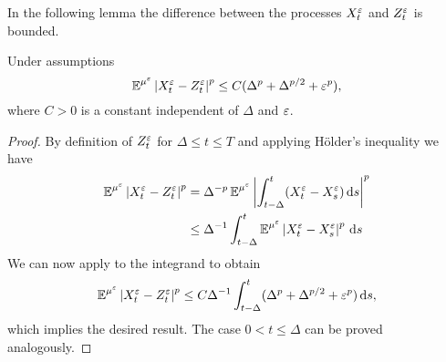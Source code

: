 \documentclass[10pt]{article}
\begin{document}
In the following lemma the difference between the processes $X_t^\varepsilon$ and $Z_t^\varepsilon$ is bounded. 
\begin{lemma}\label{lem:BoundDiffCont} Under assumptions 
	\begin{equation}
		\operatorname{\mathbb{E}}^{\mu^\varepsilon} \left\lvert X_t^\varepsilon - Z_t^\varepsilon\right\rvert^p \leq C (\Delta^p + \Delta^{p/2} + \varepsilon^p),
	\end{equation}
	where $C > 0$ is a constant independent of $\Delta$ and $\varepsilon$.
\end{lemma}
\begin{proof} By definition of $Z_t^\varepsilon$ for $\Delta \leq t \leq T$ and applying Hölder's inequality we have
	\begin{equation}
	\begin{aligned}
		\operatorname{\mathbb{E}}^{\mu^\varepsilon} \left\lvert X_t^\varepsilon - Z_t^\varepsilon\right\rvert^p &= \Delta^{-p} \operatorname{\mathbb{E}}^{\mu^\varepsilon} \left\lvert\int_{t-\Delta}^t (X_t^\varepsilon - X_s^\varepsilon) \,\mathrm{d} s\right\rvert^p \\
		&\leq \Delta^{-1} \int_{t-\Delta}^t  \operatorname{\mathbb{E}}^{\mu^\varepsilon} \left\lvert X_t^\varepsilon - X_s^\varepsilon\right\rvert^p \,\mathrm{d} s
	\end{aligned}
	\end{equation}
	We can now apply \cite[Lemma 6.1]{PaS07} to the integrand to obtain
	\begin{equation}
		\operatorname{\mathbb{E}}^{\mu^\varepsilon} \left\lvert X_t^\varepsilon - Z_t^\varepsilon\right\rvert^p \leq C\Delta^{-1} \int_{t-\Delta}^t (\Delta^p + \Delta^{p/2} + \varepsilon^p) \,\mathrm{d} s,
	\end{equation}
	which implies the desired result. The case $0 < t \leq \Delta$ can be proved analogously.
\end{proof}
\end{document}

